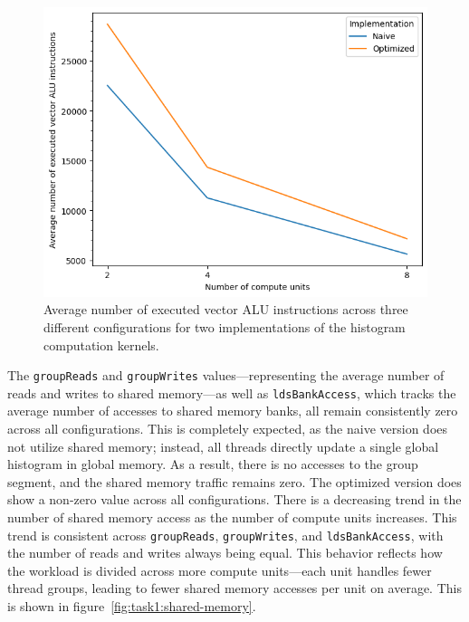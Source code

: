 \documentclass[10pt]{article}
\begin{document}
\begin{figure}[htbp]
    \centering
    \includegraphics[width=0.6\linewidth]{images/task1/rs4-t1-avg-executed-vector-alu-instructions.png}
    \caption{Average number of executed vector ALU instructions across three different configurations for two implementations of the histogram computation kernels.}
    \label{fig:task1:alu-instructions}
\end{figure}

The \texttt{groupReads} and \texttt{groupWrites} values—representing the average number of reads and writes to shared memory—as well as \texttt{ldsBankAccess}, which tracks the average number of accesses to shared memory banks, all remain consistently zero across all configurations. This is completely expected, as the naive version does not utilize shared memory; instead, all threads directly update a single global histogram in global memory. As a result, there is no accesses to the group segment, and the shared memory traffic remains zero.
The optimized version does show a non-zero value across all configurations. There is a decreasing trend in the number of shared memory access as the number of compute units increases. This trend is consistent across \texttt{groupReads}, \texttt{groupWrites}, and \texttt{ldsBankAccess}, with the number of reads and writes always being equal. This behavior reflects how the workload is divided across more compute units—each unit handles fewer thread groups, leading to fewer shared memory accesses per unit on average. This is shown in figure~\ref{fig:task1:shared-memory}.
\end{document}
